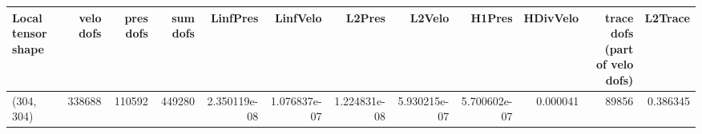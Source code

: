 \begin{tabular}{lrrrrrrrrrrr}
\toprule
Local tensor shape &  velo dofs &  pres dofs &  sum dofs &     LinfPres &     LinfVelo &       L2Pres &       L2Velo &       H1Pres &  HDivVelo &  trace dofs (part of velo dofs) &  L2Trace \\
\midrule
        (304, 304) &     338688 &     110592 &    449280 & 2.350119e-08 & 1.076837e-07 & 1.224831e-08 & 5.930215e-07 & 5.700602e-07 &  0.000041 &                           89856 & 0.386345 \\
\bottomrule
\end{tabular}
